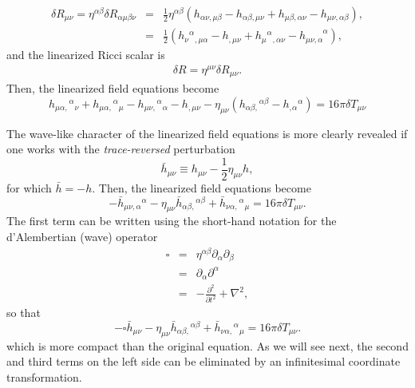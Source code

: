 \documentclass[12pt]{article}
\begin{document}
{\begin{eqnarray}
\delta R_{\mu\nu}=\eta^{\alpha\beta} \delta R_{\alpha\mu\beta\nu} & = & \frac{1}{2}\eta^{\alpha\beta}(h_{\alpha\nu,\mu\beta}-h_{\alpha\beta,\mu\nu}+h_{\mu\beta,\alpha\nu}-h_{\mu\nu,\alpha\beta}),\nonumber\\
& = & \frac{1}{2}(h_{\nu}{}^{\alpha}{}_{,\mu\alpha}-h_{,\mu\nu}+h_{\mu}{}^{\alpha}{}_{,\alpha\nu}-h_{\mu\nu,\alpha}^{\phantom{\mu\nu,\alpha}\alpha}),
\end{eqnarray} 
and the linearized Ricci scalar is 
\begin{eqnarray}
\delta R = \eta^{\mu\nu}\delta R_{\mu\nu}.
\end{eqnarray}
Then, the linearized field equations become
$$
h_{\mu \alpha,}{}^{\alpha}{}_{ \nu}+h_{\mu \alpha,}{}^{\alpha}{}_{\mu}-h_{\mu \nu,}{}^{\alpha}{}_ \alpha - h_{, \mu \nu}-\eta_{\mu \nu}
\left(h_{\alpha \beta,}{}^{\alpha \beta}-h_{,}{}_{ \alpha}{}^{\alpha}\right)=16 \pi \delta T_{\mu \nu}
$$ 
 
The wave-like character of the linearized field equations is more clearly revealed if one works with the \textit{trace-reversed} perturbation 
$$
\bar{h}_{\mu \nu} \equiv h_{\mu \nu}-\frac{1}{2} \eta_{\mu \nu} h,
$$
for which $\bar h=-h$. Then, the linearized field equations become
$$
-\bar{h}_{\mu \nu, \alpha}{}^{\alpha}-\eta_{\mu \nu} \bar{h}_{\alpha \beta,}{}^{\alpha \beta}+\bar{h}_{\nu \alpha,}{}^{\alpha}{}_{ \mu}=16 \pi \delta T_{\mu \nu}.
$$
The first term can be written using the short-hand notation for the d'Alembertian (wave) operator
\begin{eqnarray}
\square & = & \eta^{\alpha\beta} \partial_{\alpha}\partial_{\beta}\nonumber\\
& = & \partial_{\alpha}\partial^{\alpha}\nonumber\\
& = & -\frac{\partial^{2}}{\partial t^{2}}+\nabla^{2}\nonumber,
\end{eqnarray}
so that 
$$
\boxed{-\square \bar{h}_{\mu \nu}-\eta_{\mu \nu} \bar{h}_{\alpha \beta,}{}^{\alpha
\beta}+\bar{h}_{\nu \alpha,}{}^{\alpha}{}_{ \mu}=16 \pi \delta T_{\mu \nu}}.
$$
which is more compact than the original equation. As we will see next, the second and third terms on the left side can be eliminated by an infinitesimal coordinate transformation. 
}
\end{document}
